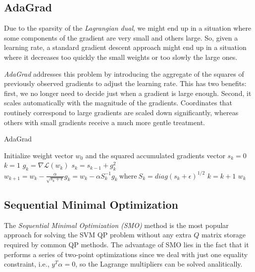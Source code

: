 \subsection{AdaGrad}

Due to the sparsity of the \emph{Lagrangian dual}, we might end up in a situation where some components of the gradient are very small and others large. So, given a learning rate, a standard gradient descent approach might end up in a situation where it decreases too quickly the small weights or too slowly the large ones.

\emph{AdaGrad} \cite{duchi2011adaptive} addresses this problem by introducing the aggregate of the squares of previously observed gradients to adjust the learning rate. This has two benefits: first, we no longer need to decide just when a gradient is large enough. Second, it scales automatically with the magnitude of the gradients. Coordinates that routinely correspond to large gradients are scaled down significantly, whereas others with small gradients receive a much more gentle treatment.

\begin{algorithm}[H]
	\caption{AdaGrad}
	\label{alg:adagrad}
	\begin{algorithmic}
			\State Initialize weight vector $w_0$ and the squared accumulated gradients vector $s_k = 0$
			\State $k = 1$
				\State $g_k = \nabla \mathcal{L}(w_k)$
				\State $s_k = s_{k-1} + g_k^2$
				\State $w_{k+1} = w_k - \displaystyle \frac{\alpha}{\sqrt{s_k + \epsilon}} g_k = w_k - \alpha S_k^{-1} g_k \ \text{where} \ S_k = diag(s_k + \epsilon)^{1/2}$
				\State $k = k + 1$
			\EndWhile
			\State \Return $w_k$
		\EndFunction
	\end{algorithmic}
\end{algorithm}

\subsection{Sequential Minimal Optimization}

The \emph{Sequential Minimal Optimization (SMO)} \cite{platt1998sequential} method is the most popular approach for solving the SVM QP problem without any extra $Q$ matrix storage required by common QP methods. The advantage of SMO lies in the fact that it performs a series of two-point optimizations since we deal with just one equality constraint, i.e., $y^T \alpha=0$, so the Lagrange multipliers can be solved analitically.

